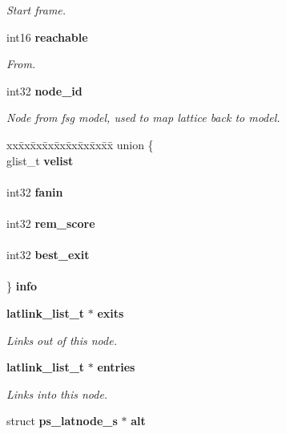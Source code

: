 \begin{DoxyCompactItemize}
\begin{DoxyCompactList}\small\item\em Start frame. \end{DoxyCompactList}\item 
int16 {\bf reachable}
\begin{DoxyCompactList}\small\item\em From. \end{DoxyCompactList}\item 
int32 {\bf node\+\_\+id}\label{structps__latnode__s_a50d14c033652a4fb387f76881df1c3f6}

\begin{DoxyCompactList}\small\item\em Node from fsg model, used to map lattice back to model. \end{DoxyCompactList}\item 
\begin{tabbing}
xx\=xx\=xx\=xx\=xx\=xx\=xx\=xx\=xx\=\kill
union \{\\
\>glist\_t {\bf velist}\\
\>\\
\>int32 {\bf fanin}\\
\>\\
\>int32 {\bf rem\_score}\\
\>\\
\>int32 {\bf best\_exit}\\
\>\\
\} {\bfseries info}\label{structps__latnode__s_a08268f9ec02dc27bead7ad7524838969}
\\

\end{tabbing}\item 
{\bf latlink\+\_\+list\+\_\+t} $\ast$ {\bf exits}\label{structps__latnode__s_a5232eefbc6e800b77e7a3c8ee3f4135d}

\begin{DoxyCompactList}\small\item\em Links out of this node. \end{DoxyCompactList}\item 
{\bf latlink\+\_\+list\+\_\+t} $\ast$ {\bf entries}\label{structps__latnode__s_a051a7eed31e29dd75151d1b34cc4eefa}

\begin{DoxyCompactList}\small\item\em Links into this node. \end{DoxyCompactList}\item 
struct {\bf ps\+\_\+latnode\+\_\+s} $\ast$ {\bf alt}\label{structps__latnode__s_aa4c0a395c74acbacccde561f92fa89e4}


\end{DoxyCompactItemize}
